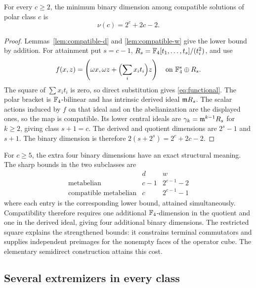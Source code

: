 \begin{theorem}\label{thm:compatible-minimum}
For every \(c\ge2\), the minimum binary dimension among compatible
solutions of polar class \(c\) is
\[
 \nu(c)=2^c+2c-2.
\]
\end{theorem}
\begin{proof}
Lemmas~\ref{lem:compatible-d} and \ref{lem:compatible-w} give the
lower bound by addition.
For attainment put \(s=c-1\),
\(R_s=\mathbb F_4[t_1,\ldots,t_s]/(t_i^2)\), and use
\begin{equation}\label{eq:semidirect-benchmark}
 f(x,z)=\left(\omega x,\omega z+\Bigl(\sum_i x_it_i\Bigr)z\right)
       \quad\text{on }\mathbb F_4^s\oplus R_s.
\end{equation}
The square of \(\sum x_it_i\) is zero, so direct substitution gives
\eqref{eq:functional}. The polar bracket is \(\mathbb F_4\)-bilinear and
has intrinsic derived ideal \(\mathfrak m R_s\).
The scalar actions induced by \(f\) on that ideal and on the
abelianization are the displayed ones, so the map is compatible.
Its lower central ideals are
\(\gamma_k=\mathfrak m^{k-1}R_s\) for \(k\ge2\), giving class \(s+1=c\).
The derived and quotient dimensions are \(2^s-1\) and \(s+1\).
The binary dimension is therefore \(2(s+2^s)=2^c+2c-2\).
\end{proof}

For \(c\ge5\), the extra four binary dimensions have an exact structural
meaning. The sharp bounds in the two subclasses are
\[
\begin{array}{c|cc}
 & d & w\\ \hline
\text{metabelian} & c-1 & 2^{c-1}-2\\
\text{compatible metabelian} & c & 2^{c-1}-1
\end{array}
\]
where each entry is the corresponding lower bound, attained
simultaneously. Compatibility therefore requires one additional
\(\mathbb F_4\)-dimension in the quotient and one in the derived ideal,
giving four additional binary dimensions. The restricted square
explains the strengthened bounds: it constrains terminal commutators
and supplies independent preimages for the nonempty faces of the
operator cube. The elementary semidirect construction attains this cost.

\subsection{Several extremizers in every class}

